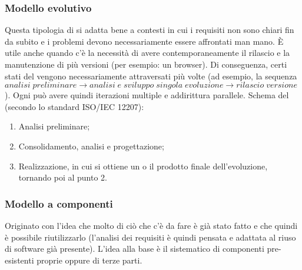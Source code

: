 \documentclass[../main]{subfiles}
\begin{document}
\subsubsection{Modello evolutivo}
Questa tipologia di  si adatta bene a contesti in cui i requisiti non sono chiari fin da subito e i problemi devono necessariamente essere affrontati man mano. È utile anche quando c'è la necessità di avere contemporaneamente il rilascio e la manutenzione di più versioni (per esempio: un browser). Di conseguenza, certi stati del  vengono necessariamente attraversati più volte (ad esempio, la sequenza $analisi\;preliminare \rightarrow analisi\;e\;sviluppo\;singola\;evoluzione \rightarrow rilascio\;versione$). Ogni  può avere quindi iterazioni multiple e addirittura parallele.
Schema del  (secondo lo standard ISO/IEC 12207):
\begin{enumerate}
    \item Analisi preliminare;
    \item Consolidamento, analisi e progettazione;
    \item Realizzazione, in cui si ottiene un  o il prodotto finale dell'evoluzione, tornando poi al punto 2.
\end{enumerate}
\subsubsection{Modello a componenti}
Originato con l'idea che molto di ciò che c'è da fare è già stato fatto e che quindi è possibile riutilizzarlo (l'analisi dei requisiti è quindi pensata e adattata al riuso di software già presente). L'idea alla base è il  sistematico di componenti pre-esistenti proprie oppure di terze parti.
\end{document}
